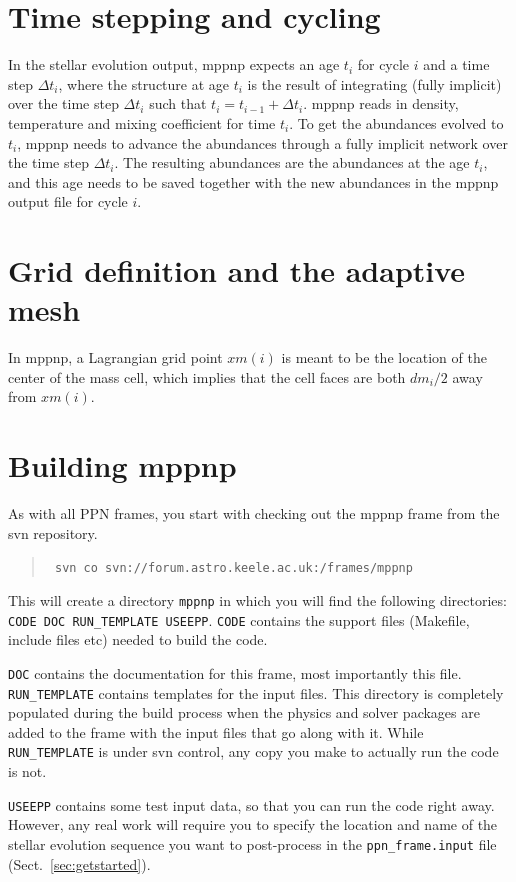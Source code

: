 \section{Time stepping and cycling}
In the stellar evolution output, mppnp expects an age $t_i$ for cycle
$i$ and a time step $\Delta t_i$, where the structure at age $t_i$ is
the result of integrating (fully implicit) over the time step $\Delta
t_i$ such that $t_{i} = t_{i-1} + \Delta t_i$.  mppnp reads in
density, temperature and mixing coefficient for time $t_i$. To get
the abundances evolved to $t_i$, mppnp needs to advance the abundances
through a fully implicit network over the time step $\Delta t_i$. The resulting
abundances are the abundances at the age $t_i$, and this age needs to be
saved together with the new abundances in the mppnp output file for
cycle $i$.

\section{Grid definition and the adaptive mesh}
In mppnp, a Lagrangian grid point $xm(i)$ is meant to be the location of the
center of the mass cell, which implies that the cell faces are both
$dm_i/2$ away from $xm(i)$.

\section{Building mppnp}
As with all PPN frames, you start with checking out the mppnp frame
from the svn repository.
\begin{quote}
\texttt{ svn co svn://forum.astro.keele.ac.uk:/frames/mppnp}
\end{quote}
This will create a directory \texttt{mppnp} in which you will find
the following directories: \texttt{CODE DOC RUN\_TEMPLATE
  USEEPP}. \texttt{CODE} contains the support
files (Makefile, include files etc) needed to build the code.

\texttt{DOC} contains the documentation for this frame, most
importantly this file. \texttt{RUN\_TEMPLATE} contains templates for
the input files. This directory is completely populated during
the build process when the physics and solver packages are added
to the frame with the input files that go along with it. While
\texttt{RUN\_TEMPLATE} is under svn control, any copy you make to actually
run the code is not.

\texttt{USEEPP} contains some test input data, so that you can run the
code right away. However, any real work will require you to specify
the location and name of the stellar evolution sequence you want to
post-process in the \texttt{ppn\_frame.input} file (Sect.\ \ref{sec:getstarted}).

